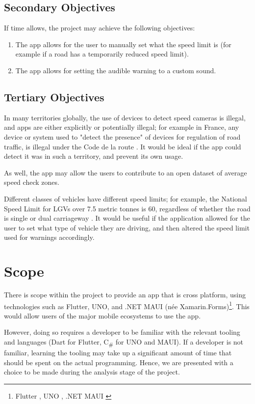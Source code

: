 \documentclass[11pt, a4paper, notitlepage]{report}
\newcounter{objectivesCounter}
\begin{document}
\subsection{Secondary Objectives}
If time allows, the project may achieve the following objectives:
\begin{enumerate}
    \setcounter{enumi}{\value{objectivesCounter}}
    \item The app allows for the user to manually set what the speed limit is 
    (for example if a road has a temporarily reduced speed limit).
    \item The app allows for setting the audible warning to a custom sound.
\end{enumerate}

\subsection{Tertiary Objectives}
In many territories globally, the use of devices to detect speed cameras is 
illegal, and apps are either explicitly or potentially illegal; for example in 
France, any device or system used to "detect the presence" of devices for 
regulation of road traffic, is illegal under the Code de la route 
\citep{CodeDeLaRoute}.
It would be ideal if the app could detect it was in such a territory, and 
prevent its own usage.

As well, the app may allow the users to contribute to an open dataset of 
average speed check zones.

Different classes of vehicles have different speed limits; for example, the National Speed Limit for LGVs over 7.5 metric tonnes is 60, regardless of whether the road is single or dual carriageway \citep{GovUKSpeedLimits}. It would be useful if the application allowed for the user to set what type of vehicle they are driving, and then altered the speed limit used for warnings accordingly.

\section{Scope}\label{sec:Scope}
There is scope within the project to provide an app that is cross platform, 
using technologies such as Flutter, UNO, and .NET MAUI (née 
Xamarin.Forms)\footnote{Flutter \citep{FlutterWebsite}, UNO \citep{UnoWebsite}, 
.NET MAUI \citep{UnoWebsite}}. This would allow users of the major mobile 
ecosystems to use the app. 

However, doing so requires a developer to be familiar with the relevant tooling 
and languages (Dart for Flutter, C\textsubscript{\#} for UNO and MAUI). If a 
developer is not familiar, learning the tooling may take up a significant 
amount of time that should be spent on the actual programming. Hence, we are 
presented with a choice to be made during the analysis stage of the project.
\end{document}
